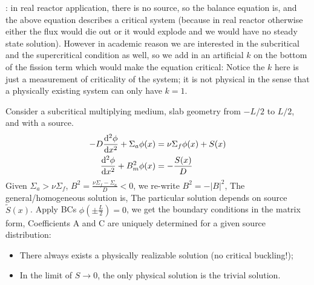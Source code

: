 \documentclass{school-22.211-notes}
\begin{document}
: in real reactor application, there is no source, so the balance equation is, 
and the above equation describes a critical system (because in real reactor otherwise either the flux would die out or it would explode and we would have no steady state solution). However in academic reason we are interested in the subcritical and the supercritical condition as well, so we add in an artificial $k$ on the bottom of the fission term which would make the equation critical: 
Notice the $k$ here is just a measurement of criticality of the system; it is not physical in the sense that a physically existing system can only have $k=1$. 



\clearpage
{} \label{one-group-source-problem-subcritical}
Consider a subcritical multiplying medium, slab geometry from $-L/2$ to $L/2$, and with a source. 
\begin{align}
  - D \frac{\mathrm{d}^{2}\phi}{\mathrm{d}x^{2}} + \Sigma_a \phi(x) &= \nu \Sigma_f \phi(x) + S(x) \\
  \frac{\mathrm{d}^{2}\phi}{\mathrm{d}x^{2}} + B_m^2 \phi(x) &= -\frac{S(x)}{D} 
\end{align}
Given $\Sigma_a > \nu \Sigma_f$, $B^2 = \frac{\nu \Sigma_f - \Sigma_a}{D} < 0 $, we re-write $B^2 = - |B|^2$,
The general/homogeneous solution is,
The particular solution depends on source $\tilde{S}(x)$. Apply BCs $\phi \left( \pm \frac{L}{2} \right) = 0$, we get the boundary conditions in the matrix form,
Coefficients A and C are uniquely determined for a given source distribution: 
\begin{itemize}
\item There always exists a physically realizable solution (no critical buckling!);
\item In the limit of $S\to 0$, the only physical solution is the trivial solution. 
\end{itemize}
\end{document}
